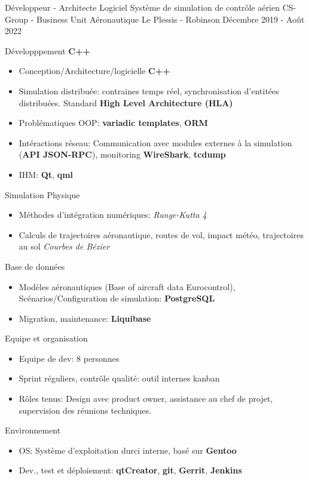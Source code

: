\begin{cventries}
	\cventry
	{Développeur - Architecte Logiciel}
	{Système de simulation de contrôle aérien}
	{CS-Group - Business Unit Aéronautique} %
	{Le Plessis - Robinson} %
	{Décembre 2019 - Août 2022} %
	{
		\begin{cvitems}
			\item{Développpement \textbf{C++}}
			\begin{itemize}
				\item{Conception\slash Architecture\slash logicielle \textbf{C++}}
				\item{Simulation distribuée: contraines temps réel, synchronisation d'entitées distribuées. Standard \textbf{High Level Architecture (HLA)}}
				\item{Problématiques OOP: \textbf{variadic templates}, \textbf{ORM}}
				\item{Intéractions réseau: Communication avec modules externes à la simulation (\textbf{API JSON-RPC}), monitoring \textbf{WireShark}, \textbf{tcdump}}
				\item{IHM: \textbf{Qt}, \textbf{qml}}
			\end{itemize}
			\item{Simulation Physique}
			\begin{itemize}
				\item{Méthodes d'intégration numériques: \textit{Runge-Kutta 4}}
				\item{Calculs de trajectoires aéronautique, routes de vol, impact météo, trajectoires au sol \textit{Courbes de Bézier}}
			\end{itemize}
			\item{Base de données}
			\begin{itemize}
				\item{Modèles aéronautiques (Base of aircraft data Eurocontrol), Scénarios\slash Configuration de simulation: \textbf{PostgreSQL}}
				\item{Migration, maintenance: \textbf{Liquibase}}
			\end{itemize}
			\item{Equipe et organisation}
			\begin{itemize}
				\item{Equipe de dev: 8 personnes}
				\item{Sprint réguliers, contrôle qualité: outil internes kanban}
				\item{Rôles tenus: Design avec product owner, assistance au chef de projet, supervision des réunions techniques.}
			\end{itemize}
			\item{Environnement}
			\begin{itemize}
				\item{OS: Système d'exploitation durci interne, basé sur \textbf{Gentoo}}
				\item{Dev., test et déploiement: \textbf{qtCreator}, \textbf{git}, \textbf{Gerrit}, \textbf{Jenkins}}
			\end{itemize}
		\end{cvitems}
	}


\end{cventries}
